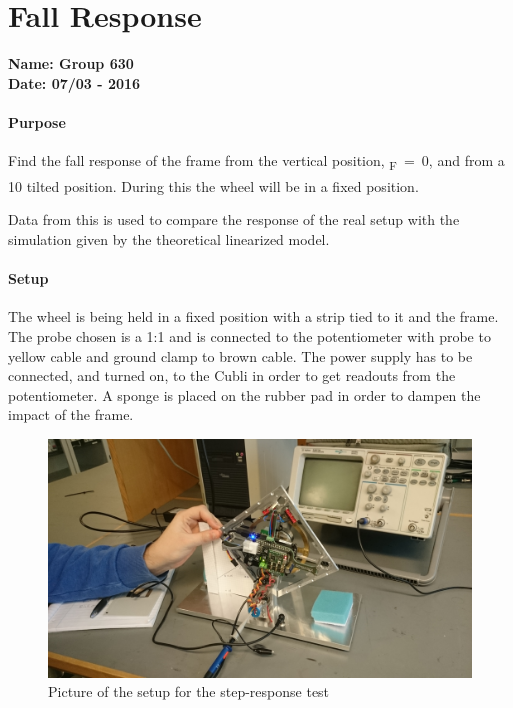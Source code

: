 \chapter{Fall Response}\label{fallResposneAppendix} 
\textbf{Name: Group 630}\\
\textbf{Date: 07/03 - 2016}

\subsubsection{Purpose}
Find the fall response of the frame from the vertical position, \si{\theta_F=0}, and from a \si{10^\circ} tilted position. During this the wheel will be in a fixed position.

Data from this is used to compare the response of the real setup with the simulation given by the theoretical linearized model.

\subsubsection{Setup}
The wheel is being held in a fixed position with a strip tied to it and the frame. The probe chosen is a 1:1 and is connected to the potentiometer with probe to yellow cable and ground clamp to brown cable. The power supply has to be connected, and turned on, to the Cubli in order to get readouts from the potentiometer. A sponge is placed on the rubber pad in order to dampen the impact of the frame.
\begin{figure}[H]                                   
	\centering                                        
	\includegraphics[scale=0.08]{figures/stepResponseSetup}
	\caption{Picture of the setup for the step-response test}
	\label{stepResponseTestPicture} 
\end{figure}              

